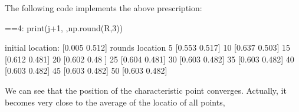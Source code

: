 \documentclass[letterpaper,10pt,english]{jupyterBook}
\begin{document}
\sphinxAtStartPar
The following code implements the above prescription:

\begin{sphinxVerbatim}[commandchars=\\\{\}]
\PYG{p}{[}\PYG{p}{]}


    
        
     
        
        \PYG{p}{[}\PYG{p}{]} 
     ==4: print(j+1, \PYGZdq{}    \PYGZdq{},np.round(R,3))   
\end{sphinxVerbatim}

\begin{sphinxVerbatim}[commandchars=\\\{\}]
initial location:
[0.005 0.512]
rounds  location
5      [0.553 0.517]
10      [0.637 0.503]
15      [0.612 0.481]
20      [0.602 0.48 ]
25      [0.604 0.481]
30      [0.603 0.482]
35      [0.603 0.482]
40      [0.603 0.482]
45      [0.603 0.482]
50      [0.603 0.482]
\end{sphinxVerbatim}

\sphinxAtStartPar
We can see that the position of the characteristic point converges. Actually, it becomes very close to the average of the locatio of all points,
\end{document}
